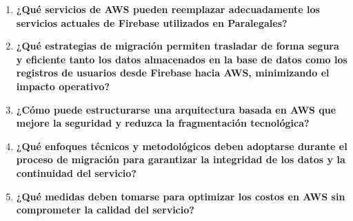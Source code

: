 \begin{enumerate}
  \item \textbf{¿Qué servicios de AWS pueden reemplazar adecuadamente los servicios actuales de Firebase utilizados en Paralegales?}
  \item \textbf{¿Qué estrategias de migración permiten trasladar de forma segura y eficiente tanto los datos almacenados en la base de datos como los registros de usuarios desde Firebase hacia AWS, minimizando el impacto operativo?}
  \item \textbf{¿Cómo puede estructurarse una arquitectura basada en AWS que mejore la seguridad y reduzca la fragmentación tecnológica?}
  \item \textbf{¿Qué enfoques técnicos y metodológicos deben adoptarse durante el proceso de migración para garantizar la integridad de los datos y la continuidad del servicio?}
  \item \textbf{¿Qué medidas deben tomarse para optimizar los costos en AWS sin comprometer la calidad del servicio?}
\end{enumerate}
